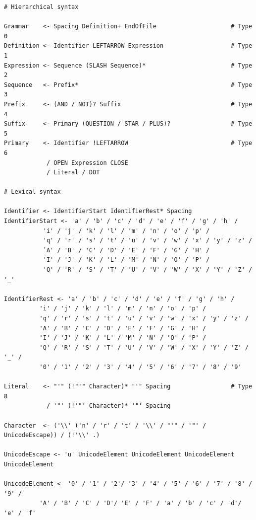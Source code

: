 \documentclass[diploma]{softlab-thesis}
\begin{document}
\begin{Verbatim}
# Hierarchical syntax

Grammar    <- Spacing Definition+ EndOfFile                     # Type 0
Definition <- Identifier LEFTARROW Expression                   # Type 1
Expression <- Sequence (SLASH Sequence)*                        # Type 2
Sequence   <- Prefix*                                           # Type 3
Prefix     <- (AND / NOT)? Suffix                               # Type 4
Suffix     <- Primary (QUESTION / STAR / PLUS)?                 # Type 5
Primary    <- Identifier !LEFTARROW                             # Type 6
            / OPEN Expression CLOSE
            / Literal / DOT

# Lexical syntax

Identifier <- IdentifierStart IdentifierRest* Spacing
IdentifierStart <- 'a' / 'b' / 'c' / 'd' / 'e' / 'f' / 'g' / 'h' / 
		   'i' / 'j' / 'k' / 'l' / 'm' / 'n' / 'o' / 'p' / 
		   'q' / 'r' / 's' / 't' / 'u' / 'v' / 'w' / 'x' / 'y' / 'z' / 
		   ᾽A' / 'B' / 'C' / 'D' / 'E' / 'F' / 'G' / 'H' / 
		   'I' / 'J' / 'K' / 'L' / 'M' / 'N' / 'O' / 'P' / 
		   'Q' / 'R' / 'S' / 'T' / 'U' / 'V' / 'W' / 'X' / 'Y' / 'Z' / '_'

IdentifierRest <- 'a' / 'b' / 'c' / 'd' / 'e' / 'f' / 'g' / 'h' / 
		  'i' / 'j' / 'k' / 'l' / 'm' / 'n' / 'o' / 'p' / 
		  'q' / 'r' / 's' / 't' / 'u' / 'v' / 'w' / 'x' / 'y' / 'z' / 
		  'A' / 'B' / 'C' / 'D' / 'E' / 'F' / 'G' / 'H' / 
		  'I' / 'J' / 'K' / 'L' / 'M' / 'N' / 'O' / 'P' / 
		  'Q' / 'R' / 'S' / 'T' / 'U' / 'V' / 'W' / 'X' / 'Y' / 'Z' / '_' / 
		  '0' / '1' / '2' / '3' / '4' / '5' / '6' / '7' / '8' / '9'

Literal    <- "'" (!"'" Character)* "'" Spacing                 # Type 8
            / '"' (!'"' Character)* '"' Spacing

Character  <- ('\\' ('n' / 'r' / 't' / '\\' / "'" / '"' / UnicodeEscape)) / (!'\\' .)

UnicodeEscape <- 'u' UnicodeElement UnicodeElement UnicodeElement UnicodeElement

UnicodeElement <- '0' / '1' / '2'/ '3' / '4' / '5' / '6' / '7' / '8' / '9' / 
		  'A' / 'B' / 'C' / 'D'/ 'E' / 'F' / 'a' / 'b' / 'c' / 'd'/ 'e' / 'f'



\end{Verbatim}
\end{document}
